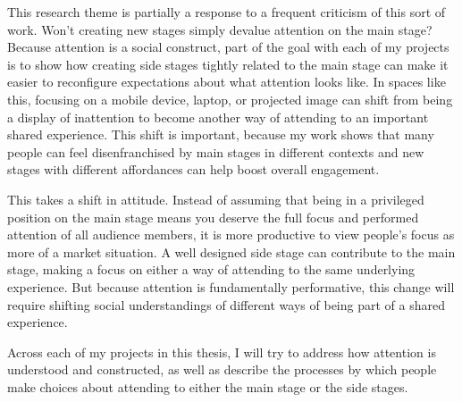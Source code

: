 This research theme is partially a response to a frequent criticism of this sort of work. Won't creating new stages simply devalue attention on the main stage? Because attention is a social construct, part of the goal with each of my projects is to show how creating side stages tightly related to the main stage can make it easier to reconfigure expectations about what attention looks like. In spaces like this, focusing on a mobile device, laptop, or projected image can shift from being a display of inattention to become another way of attending to an important shared experience. This shift is important, because my work shows that many people can feel disenfranchised by main stages in different contexts and new stages with different affordances can help boost overall engagement.

This takes a shift in attitude. Instead of assuming that being in a privileged position on the main stage means you deserve the full focus and performed attention of all audience members, it is more productive to view people's focus as more of a market situation. A well designed side stage can contribute to the main stage, making a focus on either a way of attending to the same underlying experience. But because attention is fundamentally performative, this change will require shifting social understandings of different ways of being part of a shared experience.

Across each of my projects in this thesis, I will try to address how attention is understood and constructed, as well as describe the processes by which people make choices about attending to either the main stage or the side stages.







